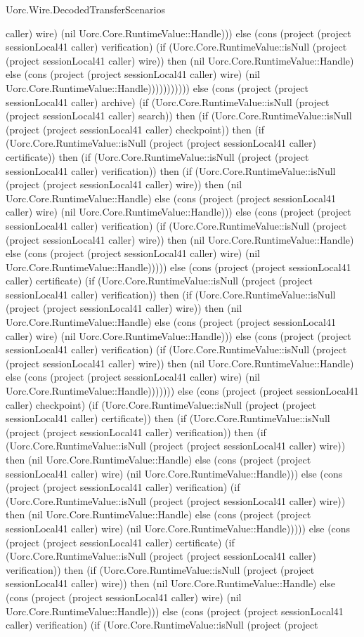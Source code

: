 \begin{lexlean}{Uorc.Wire.DecodedTransferScenarios}
\begin{semanticmodule}
{caller) wire) (nil Uorc.Core.RuntimeValue::Handle))) else (cons (project (project sessionLocal41 caller) verification) (if (Uorc.Core.RuntimeValue::isNull (project (project sessionLocal41 caller) wire)) then (nil Uorc.Core.RuntimeValue::Handle) else (cons (project (project sessionLocal41 caller) wire) (nil Uorc.Core.RuntimeValue::Handle))))))))))) else (cons (project (project sessionLocal41 caller) archive) (if (Uorc.Core.RuntimeValue::isNull (project (project sessionLocal41 caller) search)) then (if (Uorc.Core.RuntimeValue::isNull (project (project sessionLocal41 caller) checkpoint)) then (if (Uorc.Core.RuntimeValue::isNull (project (project sessionLocal41 caller) certificate)) then (if (Uorc.Core.RuntimeValue::isNull (project (project sessionLocal41 caller) verification)) then (if (Uorc.Core.RuntimeValue::isNull (project (project sessionLocal41 caller) wire)) then (nil Uorc.Core.RuntimeValue::Handle) else (cons (project (project sessionLocal41 caller) wire) (nil Uorc.Core.RuntimeValue::Handle))) else (cons (project (project sessionLocal41 caller) verification) (if (Uorc.Core.RuntimeValue::isNull (project (project sessionLocal41 caller) wire)) then (nil Uorc.Core.RuntimeValue::Handle) else (cons (project (project sessionLocal41 caller) wire) (nil Uorc.Core.RuntimeValue::Handle))))) else (cons (project (project sessionLocal41 caller) certificate) (if (Uorc.Core.RuntimeValue::isNull (project (project sessionLocal41 caller) verification)) then (if (Uorc.Core.RuntimeValue::isNull (project (project sessionLocal41 caller) wire)) then (nil Uorc.Core.RuntimeValue::Handle) else (cons (project (project sessionLocal41 caller) wire) (nil Uorc.Core.RuntimeValue::Handle))) else (cons (project (project sessionLocal41 caller) verification) (if (Uorc.Core.RuntimeValue::isNull (project (project sessionLocal41 caller) wire)) then (nil Uorc.Core.RuntimeValue::Handle) else (cons (project (project sessionLocal41 caller) wire) (nil Uorc.Core.RuntimeValue::Handle))))))) else (cons (project (project sessionLocal41 caller) checkpoint) (if (Uorc.Core.RuntimeValue::isNull (project (project sessionLocal41 caller) certificate)) then (if (Uorc.Core.RuntimeValue::isNull (project (project sessionLocal41 caller) verification)) then (if (Uorc.Core.RuntimeValue::isNull (project (project sessionLocal41 caller) wire)) then (nil Uorc.Core.RuntimeValue::Handle) else (cons (project (project sessionLocal41 caller) wire) (nil Uorc.Core.RuntimeValue::Handle))) else (cons (project (project sessionLocal41 caller) verification) (if (Uorc.Core.RuntimeValue::isNull (project (project sessionLocal41 caller) wire)) then (nil Uorc.Core.RuntimeValue::Handle) else (cons (project (project sessionLocal41 caller) wire) (nil Uorc.Core.RuntimeValue::Handle))))) else (cons (project (project sessionLocal41 caller) certificate) (if (Uorc.Core.RuntimeValue::isNull (project (project sessionLocal41 caller) verification)) then (if (Uorc.Core.RuntimeValue::isNull (project (project sessionLocal41 caller) wire)) then (nil Uorc.Core.RuntimeValue::Handle) else (cons (project (project sessionLocal41 caller) wire) (nil Uorc.Core.RuntimeValue::Handle))) else (cons (project (project sessionLocal41 caller) verification) (if (Uorc.Core.RuntimeValue::isNull (project (project }
\end{semanticmodule}
\end{lexlean}
